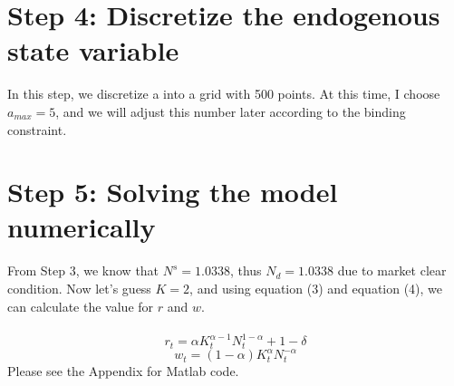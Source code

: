 \documentclass[12pt]{article}
\begin{document}
\section{Step 4: Discretize the endogenous state variable}
In this step, we discretize a into a grid with 500 points. At this time, I choose $a_{max}=5$, and we will adjust this number later according to the binding constraint.
\section{Step 5: Solving the model numerically}
From Step 3, we know that $N^s=1.0338$, thus $N_d=1.0338$ due to market clear condition. Now let's guess $K=2$, and using equation (3) and equation (4), we can calculate the value for $r$ and $w$.\\\\
\[r_{t}=\alpha K_{t}^{\alpha -1}N_{t}^{1-\alpha}+1-\delta \tag{8}\]
\[w_t=(1-\alpha)K_t^\alpha N_t^{-\alpha} \tag{9}\]
\noindent
Please see the Appendix for Matlab code.
\end{document}
